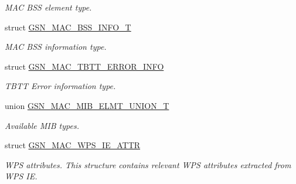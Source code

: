 \begin{DoxyCompactItemize}
\begin{DoxyCompactList}\small\item\em MAC BSS element type. \end{DoxyCompactList}\item 
struct \hyperlink{a00111}{GSN\_\-MAC\_\-BSS\_\-INFO\_\-T}
\begin{DoxyCompactList}\small\item\em MAC BSS information type. \end{DoxyCompactList}\item 
struct \hyperlink{a00134}{GSN\_\-MAC\_\-TBTT\_\-ERROR\_\-INFO}
\begin{DoxyCompactList}\small\item\em TBTT Error information type. \end{DoxyCompactList}\item 
union \hyperlink{a00117}{GSN\_\-MAC\_\-MIB\_\-ELMT\_\-UNION\_\-T}
\begin{DoxyCompactList}\small\item\em Available MIB types. \end{DoxyCompactList}\item 
struct \hyperlink{a00138}{GSN\_\-MAC\_\-WPS\_\-IE\_\-ATTR}
\begin{DoxyCompactList}\small\item\em WPS attributes. This structure contains relevant WPS attributes extracted from WPS IE. \end{DoxyCompactList}\end{DoxyCompactItemize}
